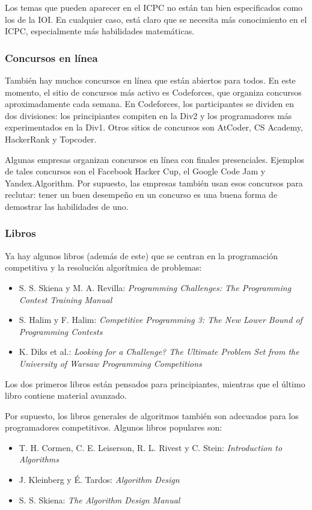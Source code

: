 Los temas que pueden aparecer en el ICPC no están tan bien
especificados como los de la IOI.
En cualquier caso, está claro que se necesita más conocimiento
en el ICPC, especialmente más habilidades matemáticas.

\subsubsection{Concursos en línea}

También hay muchos concursos en línea que están abiertos para todos.
En este momento, el sitio de concursos más activo es Codeforces,
que organiza concursos aproximadamente cada semana.
En Codeforces, los participantes se dividen en dos divisiones:
los principiantes compiten en la Div2 y los programadores más experimentados en la Div1.
Otros sitios de concursos son AtCoder, CS Academy, HackerRank y Topcoder.

Algunas empresas organizan concursos en línea con finales presenciales.
Ejemplos de tales concursos son el Facebook Hacker Cup,
el Google Code Jam y Yandex.Algorithm.
Por supuesto, las empresas también usan esos concursos para reclutar:
tener un buen desempeño en un concurso es una buena forma de demostrar las habilidades de uno.

\subsubsection{Libros}

Ya hay algunos libros (además de este) que
se centran en la programación competitiva y la resolución algorítmica de problemas:

\begin{itemize}
\item S. S. Skiena y M. A. Revilla:
\emph{Programming Challenges: The Programming Contest Training Manual} \cite{ski03}
\item S. Halim y F. Halim:
\emph{Competitive Programming 3: The New Lower Bound of Programming Contests} \cite{hal13}
\item K. Diks et al.: \emph{Looking for a Challenge? The Ultimate Problem Set from
the University of Warsaw Programming Competitions} \cite{dik12}
\end{itemize}

Los dos primeros libros están pensados para principiantes,
mientras que el último libro contiene material avanzado.

Por supuesto, los libros generales de algoritmos también son adecuados para
los programadores competitivos.
Algunos libros populares son:

\begin{itemize}
\item T. H. Cormen, C. E. Leiserson, R. L. Rivest y C. Stein:
\emph{Introduction to Algorithms} \cite{cor09}
\item J. Kleinberg y É. Tardos:
\emph{Algorithm Design} \cite{kle05}
\item S. S. Skiena:
\emph{The Algorithm Design Manual} \cite{ski08}
\end{itemize}
